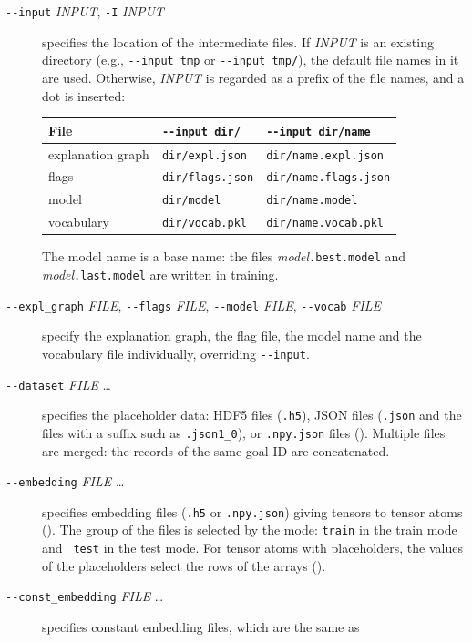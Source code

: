 \documentclass[a4paper]{report}
\begin{document}
\begin{description}
	\item[{\tt -{}-input} {\it INPUT}, {\tt -I} {\it INPUT}]
	specifies the location of the intermediate files.  If {\it INPUT} is an
	existing directory (e.g., {\tt -{}-input tmp} or {\tt -{}-input tmp/}),
	the default file names in it are used.  Otherwise, {\it INPUT} is
	regarded as a prefix of the file names, and a dot is inserted:
	\begin{center}
		\begin{tabular}{lll}
			\toprule
			File & {\tt -{}-input dir/} & {\tt -{}-input dir/name} \\
			\midrule
			explanation graph & {\tt dir/expl.json} & {\tt dir/name.expl.json} \\
			flags & {\tt dir/flags.json} & {\tt dir/name.flags.json} \\
			model & {\tt dir/model} & {\tt dir/name.model} \\
			vocabulary & {\tt dir/vocab.pkl} & {\tt dir/name.vocab.pkl} \\
			\bottomrule
		\end{tabular}
	\end{center}
	The model name is a base name: the files {\it model}{\tt .best.model}
	and {\it model}{\tt .last.model} are written in training.
	\item[{\tt -{}-expl\_graph} {\it FILE}, {\tt -{}-flags} {\it FILE}, {\tt -{}-model} {\it FILE}, {\tt -{}-vocab} {\it FILE}]
	specify the explanation graph, the flag file, the model name and the
	vocabulary file individually, overriding {\tt -{}-input}.
	\item[{\tt -{}-dataset} {\it FILE} \ldots]
	specifies the placeholder data: HDF5 files ({\tt .h5}), JSON files
	({\tt .json} and the files with a suffix such as {\tt .json1\_0}), or
	{\tt .npy.json} files ().  Multiple files
	are merged: the records of the same goal ID are concatenated.
	\item[{\tt -{}-embedding} {\it FILE} \ldots]
	specifies embedding files ({\tt .h5} or {\tt .npy.json}) giving
	tensors to tensor atoms ().  The group of
	the files is selected by the mode: {\tt train} in the train mode and {\tt
		test} in the test mode.  For tensor atoms with placeholders, the values of
	the placeholders select the rows of the arrays ().
	\item[{\tt -{}-const\_embedding} {\it FILE} \ldots]
	specifies constant embedding files, which are the same as {\tt
}
\end{description}
\end{document}

